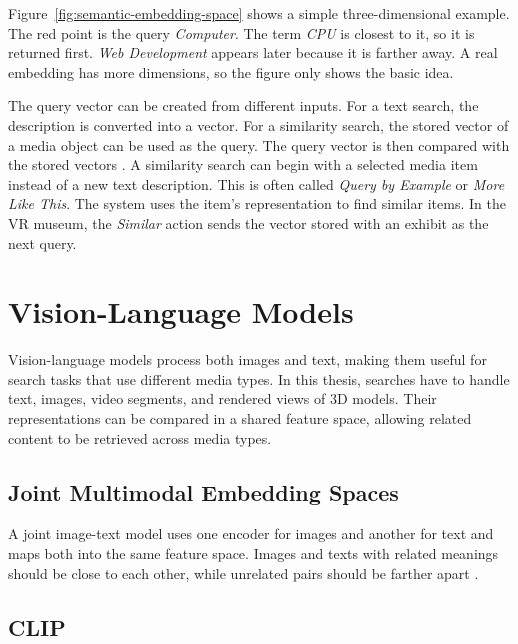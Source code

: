 Figure~\ref{fig:semantic-embedding-space} shows a simple three-dimensional example. The red point is the query \emph{Computer}. The term \emph{CPU} is closest to it, so it is returned first. \emph{Web Development} appears later because it is farther away. A real embedding has more dimensions, so the figure only shows the basic idea.

The query vector can be created from different inputs. For a text search, the description is converted into a vector. For a similarity search, the stored vector of a media object can be used as the query. The query vector is then compared with the stored vectors \citep{flickner1995qbic,rossetto2016vitrivr}. A similarity search can begin with a selected media item instead of a new text description. This is often called \emph{Query by Example} or \emph{More Like This}. The system uses the item's representation to find similar items. In the VR museum, the \emph{Similar} action sends the vector stored with an exhibit as the next query.

\section{Vision-Language Models}
\label{sec:background-vision-language}

Vision-language models process both images and text, making them useful for search tasks that use different media types. In this thesis, searches have to handle text, images, video segments, and rendered views of 3D models. Their representations can be compared in a shared feature space, allowing related content to be retrieved across media types.

\subsection{Joint Multimodal Embedding Spaces}
\label{subsec:background-joint-embedding}

A joint image-text model uses one encoder for images and another for text and maps both into the same feature space. Images and texts with related meanings should be close to each other, while unrelated pairs should be farther apart \citep{radford2021clip}.

\subsection{CLIP}
\label{sec:background-clip}

